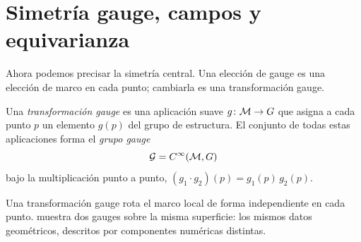 \section{Simetr\'ia gauge, campos y equivarianza}
\label{sec:gauge:symmetry}

Ahora podemos precisar la simetr\'ia central. Una elecci\'on de gauge es una
elecci\'on de marco en cada punto; cambiarla es una transformaci\'on gauge.

\begin{definition}
\label{def:gauge:transformation}
Una \emph{transformaci\'on gauge} es una aplicaci\'on suave $g\colon \mathcal{M} \to G$
que asigna a cada punto $p$ un elemento $g(p)$ del grupo de estructura. El
conjunto de todas estas aplicaciones forma el \emph{grupo gauge}
\[
  \mathcal{G} = C^\infty(\mathcal{M}, G)
\]
bajo la multiplicaci\'on punto a punto, $(g_1 \cdot g_2)(p) = g_1(p)\, g_2(p)$.
\end{definition}

Una transformaci\'on gauge rota el marco local de forma independiente en cada
punto.  muestra dos gauges sobre la misma superficie: los
mismos datos geom\'etricos, descritos por componentes num\'ericas distintas.

